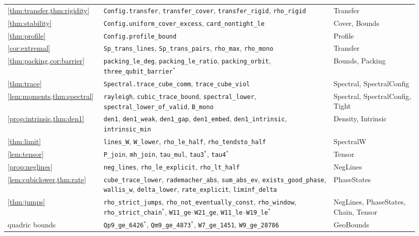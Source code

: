 \documentclass[a4paper,onecolumn,11pt,unpublished,nopdfoutputerror]{quantumarticle}
\theoremstyle{definition}
\newcommand{\lname}[1]{\texttt{\textcolor{leangreen}{#1}}}
\begin{document}
{\begin{longtable}{@{}>{\raggedright\arraybackslash}p{0.2\linewidth}>{\raggedright\arraybackslash}p{0.54\linewidth}>{\raggedright\arraybackslash}p{0.2\linewidth}@{}}
\cref{thm:transfer,thm:rigidity} & \lname{Config.transfer}, \lname{transfer\_cover}, \lname{transfer\_rigid}, \lname{rho\_rigid} & Transfer\\
\cref{thm:stability} & \lname{Config.uniform\_cover\_excess}, \lname{card\_nontight\_le} & Cover, Bounds\\
\cref{thm:profile} & \lname{Config.profile\_bound} & Profile\\
\cref{cor:extremal} & \lname{Sp\_trans\_lines}, \lname{Sp\_trans\_pairs}, \lname{rho\_max}, \lname{rho\_mono} & Transfer\\
\cref{thm:packing,cor:barrier} & \lname{packing\_le\_deg}, \lname{packing\_le\_ratio}, \lname{packing\_orbit}, \lname{three\_qubit\_barrier}$^\ast$ & Bounds, Packing\\
\cref{thm:trace} & \lname{Spectral.trace\_cube\_comm}, \lname{trace\_cube\_viol} & Spectral, SpectralConfig\\
\cref{lem:moments,thm:spectral} & \lname{rayleigh}, \lname{cubic\_trace\_bound}, \lname{spectral\_lower}, \lname{spectral\_lower\_of\_valid}, \lname{B\_mono} & Spectral, SpectralConfig, Tight\\
\cref{prop:intrinsic,thm:den1} & \lname{den1}, \lname{den1\_weak}, \lname{den1\_gap}, \lname{den1\_embed}, \lname{den1\_intrinsic}, \lname{intrinsic\_min} & Density, Intrinsic\\
\cref{thm:limit} & \lname{lines\_W}, \lname{W\_lower}, \lname{rho\_le\_half}, \lname{rho\_tendsto\_half} & SpectralW\\
\cref{lem:tensor} & \lname{P\_join}, \lname{mh\_join}, \lname{tau\_mul}, \lname{tau3}$^\ast$, \lname{tau4}$^\ast$ & Tensor\\
\cref{prop:neglines} & \lname{neg\_lines}, \lname{rho\_le\_explicit}, \lname{rho\_lt\_half} & NegLines\\
\cref{lem:cubiclower,thm:rate} & \lname{cube\_trace\_lower}, \lname{rademacher\_abs}, \lname{sum\_abs\_ev}, \lname{exists\_good\_phase}, \lname{wallis\_w}, \lname{delta\_lower}, \lname{rate\_explicit}, \lname{liminf\_delta} & PhaseStates\\
\cref{thm:jumps} & \lname{rho\_strict\_jumps}, \lname{rho\_not\_eventually\_const}, \lname{rho\_window}, \lname{rho\_strict\_chain}$^\ast$, \lname{W11\_ge}--\lname{W21\_ge}, \lname{W11\_le}--\lname{W19\_le}$^\ast$ & NegLines, PhaseStates, Chain, Tensor\\
quadric bounds & \lname{Qp9\_ge\_6426}$^\ast$, \lname{Qm9\_ge\_4873}$^\ast$, \lname{W7\_ge\_1451}, \lname{W9\_ge\_28786} & GeoBounds\\

\end{longtable}}
\end{document}
